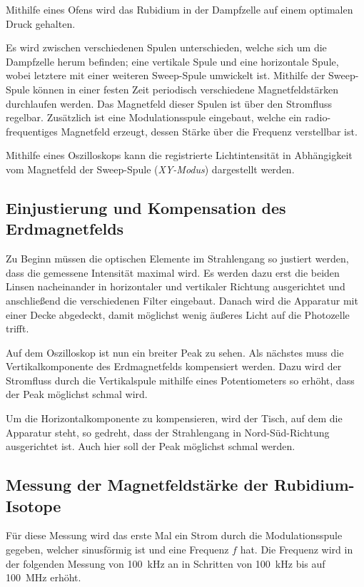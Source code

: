     Mithilfe eines Ofens wird das Rubidium in der Dampfzelle auf einem optimalen Druck gehalten.

    Es wird zwischen verschiedenen Spulen unterschieden,
    welche sich um die Dampfzelle herum befinden;
    eine vertikale Spule und eine horizontale Spule,
    wobei letztere mit einer weiteren Sweep-Spule umwickelt ist.
    Mithilfe der Sweep-Spule können in einer festen Zeit periodisch verschiedene Magnetfeldstärken durchlaufen werden.
    Das Magnetfeld dieser Spulen ist über den Stromfluss regelbar.
    Zusätzlich ist eine Modulationsspule eingebaut,
    welche ein radio-frequentiges Magnetfeld erzeugt,
    dessen Stärke über die Frequenz verstellbar ist.

    Mithilfe eines Oszilloskops kann die registrierte Lichtintensität
    in Abhängigkeit vom Magnetfeld der Sweep-Spule (\textit{XY-Modus})
    dargestellt werden.

\subsection{Einjustierung und Kompensation des Erdmagnetfelds}

    Zu Beginn müssen die optischen Elemente im Strahlengang so justiert werden,
    dass die gemessene Intensität maximal wird.
    Es werden dazu erst die beiden Linsen nacheinander in horizontaler und vertikaler Richtung ausgerichtet
    und anschließend die verschiedenen Filter eingebaut.
    Danach wird die Apparatur mit einer Decke abgedeckt,
    damit möglichst wenig äußeres Licht auf die Photozelle trifft.

    Auf dem Oszilloskop ist nun ein breiter Peak zu sehen.
    Als nächstes muss die Vertikalkomponente des Erdmagnetfelds kompensiert werden.
    Dazu wird der Stromfluss durch die Vertikalspule mithilfe eines Potentiometers so erhöht,
    dass der Peak möglichst schmal wird.

    Um die Horizontalkomponente zu kompensieren,
    wird der Tisch, auf dem die Apparatur steht, so gedreht,
    dass der Strahlengang in Nord-Süd-Richtung ausgerichtet ist.
    Auch hier soll der Peak möglichst schmal werden.

\subsection{Messung der Magnetfeldstärke der Rubidium-Isotope}

    Für diese Messung wird das erste Mal ein Strom durch die Modulationsspule gegeben,
    welcher sinusförmig ist und eine Frequenz $f$ hat.
    Die Frequenz wird in der folgenden Messung von \SI{100}{\kilo\hertz} an in Schritten von \SI{100}{\kilo\hertz} bis auf \SI{100}{\mega\hertz} erhöht.

